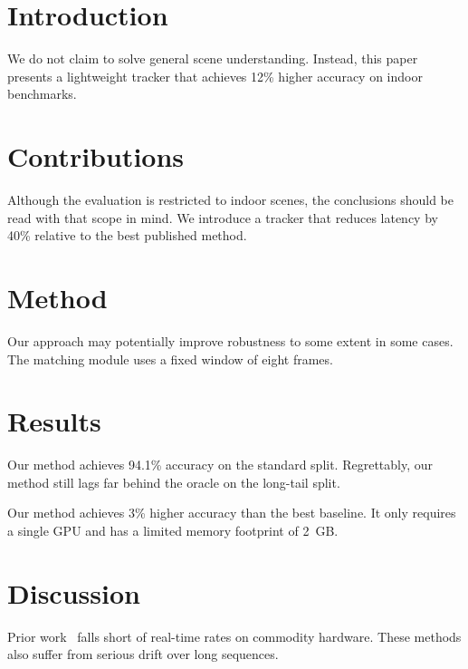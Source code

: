 \documentclass{article}
\begin{document}
\begin{abstract}
We present a lightweight tracker that achieves 12\% higher accuracy than the strongest baseline on three indoor benchmarks.
The tracker runs at 210 frames per second on a single GPU.
\end{abstract}

\section{Introduction}
We do not claim to solve general scene understanding.
Instead, this paper presents a lightweight tracker that achieves 12\% higher accuracy on indoor benchmarks.

\section{Contributions}
Although the evaluation is restricted to indoor scenes, the conclusions should be read with that scope in mind.
We introduce a tracker that reduces latency by 40\% relative to the best published method.

\section{Method}
Our approach may potentially improve robustness to some extent in some cases.
The matching module uses a fixed window of eight frames.

\section{Results}
Our method achieves 94.1\% accuracy on the standard split.
Regrettably, our method still lags far behind the oracle on the long-tail split.

Our method achieves 3\% higher accuracy than the best baseline.
It only requires a single GPU and has a limited memory footprint of 2~GB.

\section{Discussion}
Prior work~\cite{tracker2019} falls short of real-time rates on commodity hardware.
These methods also suffer from serious drift over long sequences.
\end{document}
